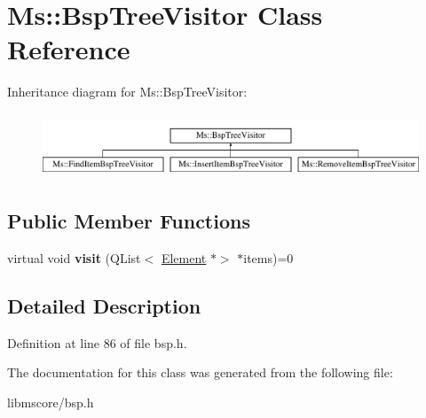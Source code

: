 \hypertarget{class_ms_1_1_bsp_tree_visitor}{}\section{Ms\+:\+:Bsp\+Tree\+Visitor Class Reference}
\label{class_ms_1_1_bsp_tree_visitor}
Inheritance diagram for Ms\+:\+:Bsp\+Tree\+Visitor\+:\begin{figure}[H]
\begin{center}
\leavevmode
\includegraphics[height=1.934370cm]{class_ms_1_1_bsp_tree_visitor}
\end{center}
\end{figure}
\subsection*{Public Member Functions}
\begin{DoxyCompactItemize}
\item 
\mbox{\label{class_ms_1_1_bsp_tree_visitor_a0b49000e620d53d825c9a97b4a53cf1a}} 
virtual void {\bfseries visit} (Q\+List$<$ \hyperlink{class_ms_1_1_element}{Element} $\ast$$>$ $\ast$items)=0
\end{DoxyCompactItemize}


\subsection{Detailed Description}


Definition at line 86 of file bsp.\+h.



The documentation for this class was generated from the following file\+:\begin{DoxyCompactItemize}
\item 
libmscore/bsp.\+h\end{DoxyCompactItemize}
